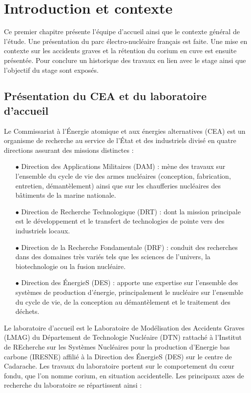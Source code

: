 \chapter{Introduction et contexte} \label{chap:1}
Ce premier chapitre présente l’équipe d’accueil ainsi que le contexte général de l’étude. Une présentation du parc électro-nucléaire français est faite. Une mise en contexte sur les accidents graves et la rétention du corium en cuve est ensuite présentée. Pour conclure un historique des travaux en lien avec le stage ainsi que l’objectif du stage sont exposés.
\section{Présentation du CEA et du laboratoire d'accueil}
Le Commissariat à l'Énergie atomique et aux énergies alternatives (CEA) est un organisme de recherche au service de l'État et des industriels divisé en quatre directions assurant des missions distinctes :
\begin{itemize}
	\item[$\bullet$] Direction des Applications Militaires (DAM) : mène des travaux sur l'ensemble du cycle de vie des armes nucléaires (conception, fabrication, entretien, démantèlement) ainsi que sur les chaufferies nucléaires des bâtiments de la marine nationale.
	\item[$\bullet$] Direction de Recherche Technologique (DRT) : dont la mission principale est le développement et le transfert de technologies de pointe vers des industriels locaux.
	\item[$\bullet$] Direction de la Recherche Fondamentale (DRF) : conduit des recherches dans des domaines très variés tels que les sciences de l'univers, la biotechnologie ou la fusion nucléaire.
	\item[$\bullet$] Direction des ÉnergieS (DES) : apporte une expertise sur l'ensemble des systèmes de production d'énergie, principalement le nucléaire sur l'ensemble du cycle de vie, de la conception au démantèlement et le traitement des déchets. 
\end{itemize}
Le laboratoire d'accueil est le Laboratoire de Modélisation des Accidents Graves (LMAG) du Département de Technologie Nucléaire (DTN) rattaché à l'Institut de REcherche sur les Systèmes Nucléaires pour la production d’Energie bas carbone (IRESNE) affilié à la Direction des ÉnergieS (DES) sur le centre de Cadarache.
Les travaux du laboratoire portent sur le comportement du c\oe ur fondu, que l'on nomme corium, en situation accidentelle. Les principaux axes de recherche du laboratoire se répartissent ainsi :

